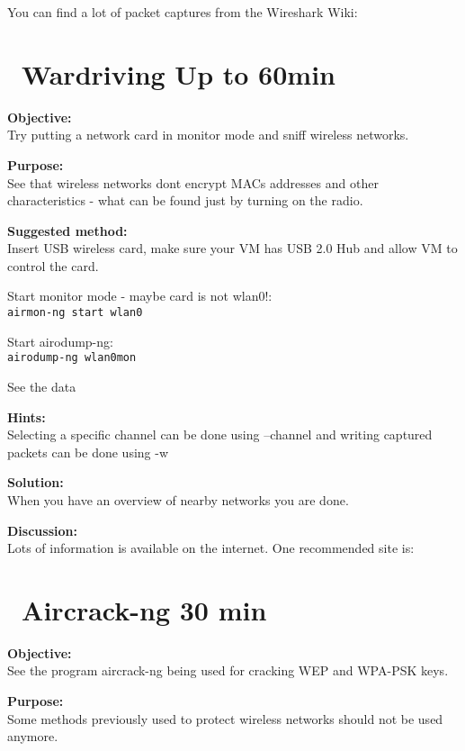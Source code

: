 \documentclass[a4paper,11pt,notitlepage]{report}
\begin{document}
You can find a lot of packet captures from the Wireshark Wiki:\\




\chapter{\faInfoCircle\ Wardriving Up to 60min}
\label{ex:wardriving}

{\bf Objective:}\\
Try putting a network card in monitor mode and sniff wireless networks.

{\bf Purpose:}\\
See that wireless networks dont encrypt MACs addresses and other characteristics - what can be found just by turning on the radio.

{\bf Suggested method:}\\
Insert USB wireless card, make sure your VM has USB 2.0 Hub and allow VM to control the card.

Start monitor mode - maybe card is not wlan0!:\\
\verb+airmon-ng start wlan0+

Start airodump-ng:\\
\verb+airodump-ng wlan0mon+

See the data

{\bf Hints:}\\
Selecting a specific channel can be done using --channel and writing captured packets can be done using -w

{\bf Solution:}\\
When you have an overview of nearby networks you are done.

{\bf Discussion:}\\

Lots of information is available on the internet. One recommended site is:\\


\chapter{\faExclamationTriangle\ Aircrack-ng 30 min}
\label{ex:aircrack-ng}

{\bf Objective:}\\
See the program aircrack-ng being used for cracking WEP and WPA-PSK keys.

{\bf Purpose:}\\
Some methods previously used to protect wireless networks should not be used anymore.
\end{document}
